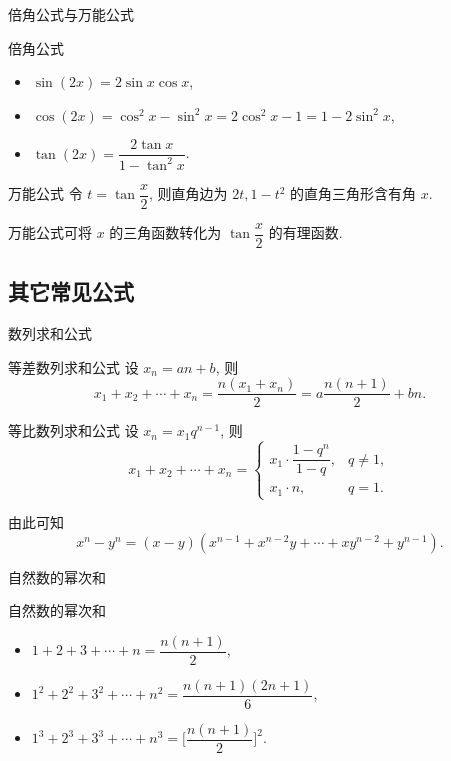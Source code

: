 \begin{frame}{倍角公式与万能公式}
	\onslide<+->
	\begin{block}{倍角公式}
		\begin{itemize}
			\item $\sin(2x)=2\sin x\cos x$,
			\item $\cos(2x)=\cos^2x-\sin^2x=2\cos^2x-1=1-2\sin^2x$,
			\item $\tan(2x)=\dfrac{2\tan x}{1-\tan^2x}$.
		\end{itemize}
	\end{block}
	\onslide<+->
	\begin{block}{万能公式}
		令 $t=\tan\dfrac x2$, 则直角边为 $2t,1-t^2$ 的直角三角形含有角 $x$.
		\onslide<+->{由于斜边是 $1+t^2$, 因此
		\[\sin x=\frac{2t}{1+t^2},\quad
			\cos x=\frac{1-t^2}{1+t^2},\quad
			\tan x=\frac{2t}{1-t^2}.\]}
	\end{block}
	\onslide<+->
	万能公式可将 $x$ 的三角函数转化为 $\tan \dfrac x2$ 的有理函数.
\end{frame}

\subsection{其它常见公式}

\begin{frame}{数列求和公式}
	\onslide<+->
	\begin{block}{等差数列求和公式}
		设 $x_n=an+b$, 则
		\[x_1+x_2+\cdots+x_n=\frac{n(x_1+x_n)}2=a\frac{n(n+1)}2+bn.\]
	\end{block}
	\onslide<+->
	\begin{block}{等比数列求和公式}
		设 $x_n=x_1 q^{n-1}$, 则
		\[x_1+x_2+\cdots+x_n=\begin{cases}
			x_1\cdot\dfrac{1-q^n}{1-q},& q\neq 1,\\
			x_1\cdot n, & q=1.
		\end{cases}\]
	\end{block}
	\onslide<+->
	由此可知
	\[x^n-y^n=(x-y)(x^{n-1}+x^{n-2}y+\cdots+xy^{n-2}+y^{n-1}).\]
\end{frame}


\begin{frame}{自然数的幂次和}
	\onslide<+->
	\begin{block}{自然数的幂次和}
		\begin{itemize}
			\item $1+2+3+\cdots+n=\dfrac{n(n+1)}2$,
			\item $1^2+2^2+3^2+\cdots+n^2=\dfrac{n(n+1)(2n+1)}6$,
			\item $1^3+2^3+3^3+\cdots+n^3=\biggl[\dfrac{n(n+1)}2\biggr]^2$.
		\end{itemize}
	\end{block}
\end{frame}


